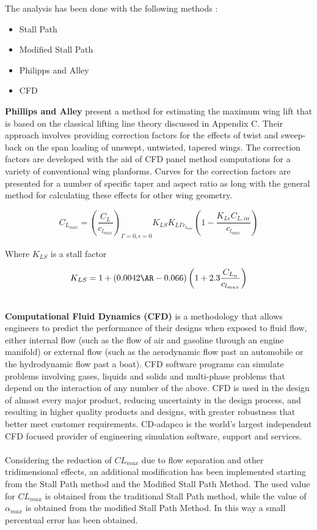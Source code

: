 The analysis has been done with the following methods :

\begin{itemize}
\item Stall Path
\item Modified Stall Path
\item Philipps and Alley
\item CFD
\end{itemize}

{\bfseries Phillips and Alley} present a method for estimating the maximum wing lift that is based on the classical lifting line theory discussed in Appendix C. Their approach involves providing correction factors for the effects of twist and sweep-back on the span loading of unswept, untwisted, tapered wings. The correction factors are developed with the aid of CFD panel method computations for a variety of conventional wing planforms. Curves for the correction factors are presented for a number of specific taper and aspect ratio as long with the general method for calculating these effects for other wing geometry. \cite{sforza2014commercial}

\begin{equation}
C_{L_{max}} = \left ( \frac{C_L}{c_{l_{max}}}\right)_{\Gamma =0 , \epsilon =0} K_{LS} K_{L\Gamma c_{l_{max}}} \left ( 1 - \frac { K_{L \epsilon} C_{L,\alpha \epsilon}}{c_{l_{max}}} \right) 
\end{equation}

Where $K_{LS}$ is a stall factor

\begin{equation}
K_{LS}=1 + (0.0042 \AR -0.066) \left (1+2.3 \frac{C_{L_{\alpha}}}{ c_{l_{max}}} \right )
\end{equation}

\noindent \\
{\bfseries Computational Fluid Dynamics (CFD)} is a methodology that allows engineers to predict the performance of their designs when exposed to fluid flow, either internal flow (such as the flow of air and gasoline through an engine manifold) or external flow (such as the aerodynamic flow past an automobile or the hydrodynamic flow past a boat). CFD software programs can simulate problems involving gases, liquids and solids and multi-phase problems that depend on the interaction of any number of the above. CFD is used in the design of almost every major product, reducing uncertainty in the design process, and resulting in higher quality products and designs, with greater robustness that better meet customer requirements. CD-adapco is the world's largest independent CFD focused provider of engineering simulation software, support and services. \cite{adapco} \\ \\
Considering the reduction of $CL_{max}$ due to flow separation and other tridimensional effects, an additional modification has been implemented starting from the Stall Path method and the Modified Stall Path Method. The used value for $CL_{max}$ is obtained from the traditional Stall Path method, while the value of $\alpha_{max}$ is obtained from the modified Stall Path Method. In this way a small percentual error has been obtained.


